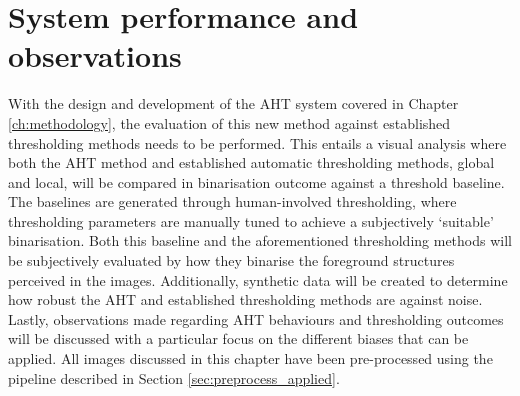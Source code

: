 \chapter{System performance and observations}\label{ch:results}
With the design and development of the AHT system covered in Chapter \ref{ch:methodology}, the evaluation of this new method against established thresholding methods needs to be performed. This entails a visual analysis where both the AHT method and established automatic thresholding methods, global and local, will be compared in binarisation outcome against a threshold baseline. The baselines are generated through human-involved thresholding, where thresholding parameters are manually tuned to achieve a subjectively `suitable' binarisation. Both this baseline and the aforementioned thresholding methods will be subjectively evaluated by how they binarise the foreground structures perceived in the images. Additionally, synthetic data will be created to determine how robust the AHT and established thresholding methods are against noise. Lastly, observations made regarding AHT behaviours and thresholding outcomes will be discussed with a particular focus on the different biases that can be applied. All images discussed in this chapter have been pre-processed using the pipeline described in Section \ref{sec:preprocess_applied}.

